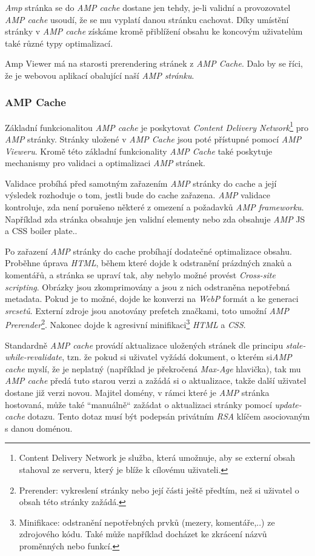 \emph{Amp} stránka se do \emph{AMP cache} dostane jen tehdy, je-li validní a provozovatel \emph{AMP cache} usoudí, že se mu vyplatí danou stránku cachovat. Díky umístění stránky v \emph{AMP cache} získáme kromě přiblížení obsahu ke koncovým uživatelům také různé typy optimalizací.

Amp Viewer má na starosti prerendering stránek z \emph{AMP Cache}. Dalo by se říci, že je webovou aplikací obalující naší \emph{AMP stránku}. 

\subsubsection*{AMP Cache}
Základní funkcionalitou \emph{AMP cache} je poskytovat \emph{Content Delivery Network}\footnote{Content Delivery Network je služba, která umožnuje, aby se externí obsah stahoval ze serveru, který je blíže k cílovému uživateli.} pro \emph{AMP} stránky. Stránky uložené v \emph{AMP Cache} jsou poté přístupné pomocí \emph{AMP Vieweru}.
Kromě této základní funkcionality \emph{AMP Cache} také poskytuje mechanismy pro validaci a optimalizaci \emph{AMP} stránek.

Validace probíhá před samotným zařazením \emph{AMP} stránky do cache a její výsledek rozhoduje o tom, jestli bude do cache zařazena.
\emph{AMP} validace kontroluje, zda není porušeno některé z omezení a požadavků \emph{AMP frameworku}. Například zda stránka obsahuje jen validní elementy nebo zda obsahuje \emph{AMP} JS a CSS boiler plate.\cite{AMPCache}.

Po zařazení \emph{AMP} stránky do cache probíhají dodatečné optimalizace obsahu.
Proběhne úprava \emph{HTML}, během které dojde k odstranění prázdných znaků a komentářů, a stránka se upraví tak, aby nebylo možné provést \emph{Cross-site scripting}\cite{whyAMPCache}.
Obrázky jsou zkomprimovány a jsou z nich odstraněna nepotřebná metadata. Pokud je to možné, dojde ke konverzi na \emph{WebP} formát a ke generaci \emph{srcsetů}.
Externí zdroje jsou anotovány prefetch značkami, toto umožní \emph{AMP Prerender}\footnote{Prerender: vykreslení stránky nebo její části ještě předtím, než si uživatel o obsah této stránky zažádá.}.
Nakonec dojde k agresivní minifikaci\footnote{Minifikace: odstranění nepotřebných prvků (mezery, komentáře,..) ze zdrojového kódu. Také může například docházet ke zkrácení názvů proměnných nebo funkcí.} \emph{HTML} a \emph{CSS}.

Standardně \emph{AMP cache} provádí aktualizace uložených stránek dle principu \emph{stale-while-revalidate}, tzn. že pokud si uživatel vyžádá dokument, o kterém si\emph{AMP cache} myslí, že je neplatný (například  je překročená \emph{Max-Age} hlavička), tak mu \emph{AMP cache} předá tuto starou verzi a zažádá si o aktualizace, takže další uživatel dostane již verzi novou\cite{AMPUpdate}.
Majitel domény, v rámci které je \emph{AMP} stránka hostovaná, může také “manuálně“ zažádat o aktualizaci stránky pomocí \emph{update-cache} dotazu. Tento dotaz musí být podepsán privátním \emph{RSA} klíčem asociovaným s danou doménou\cite{AMPUpdateUrl}.


